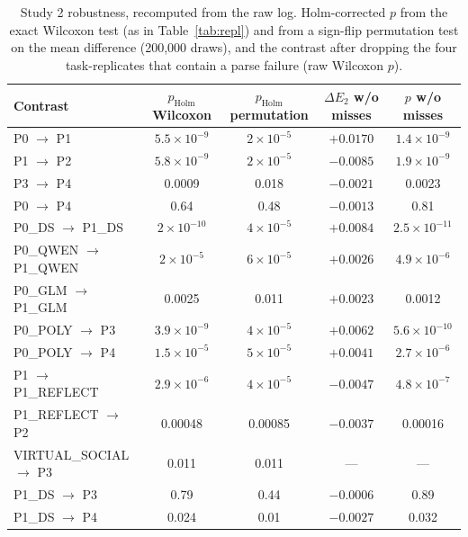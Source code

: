 \documentclass[10pt]{article}
\newenvironment{fittable}{\begin{lrbox}{\manuscripttable}}{%
\end{lrbox}\ifdim\wd\manuscripttable>\linewidth
\resizebox{\linewidth}{!}{\usebox{\manuscripttable}}%
\else\usebox{\manuscripttable}\fi}
\theoremstyle{manuscript}\newtheorem{proposition}{Proposition}
\newcommand{\pH}{p_{\text{Holm}}}
\begin{document}
\FloatBarrier

\begin{table}[ht]\centering\small\setlength{\tabcolsep}{5pt}
\caption{Study 2 robustness, recomputed from the raw log. Holm-corrected $p$ from the exact Wilcoxon test (as in Table~\ref{tab:repl}) and from a sign-flip permutation test on the mean difference (200,000 draws), and the contrast after dropping the four task-replicates that contain a parse failure (raw Wilcoxon $p$).}\label{tab:s2robust}
\begin{fittable}
\begin{tabular}{@{}lcccc@{}}\toprule
Contrast & $\pH$ Wilcoxon & $\pH$ permutation & $\Delta E_2$ w/o misses & $p$ w/o misses\\\midrule
P0 $\to$ P1 & $5.5\times10^{-9}$ & $2\times10^{-5}$ & $+0.0170$ & $1.4\times10^{-9}$\\
P1 $\to$ P2 & $5.8\times10^{-9}$ & $2\times10^{-5}$ & $-0.0085$ & $1.9\times10^{-9}$\\
P3 $\to$ P4 & 0.0009 & 0.018 & $-0.0021$ & 0.0023\\
P0 $\to$ P4 & 0.64 & 0.48 & $-0.0013$ & 0.81\\
P0\_DS $\to$ P1\_DS & $2\times10^{-10}$ & $4\times10^{-5}$ & $+0.0084$ & $2.5\times10^{-11}$\\
P0\_QWEN $\to$ P1\_QWEN & $2\times10^{-5}$ & $6\times10^{-5}$ & $+0.0026$ & $4.9\times10^{-6}$\\
P0\_GLM $\to$ P1\_GLM & 0.0025 & 0.011 & $+0.0023$ & 0.0012\\
P0\_POLY $\to$ P3 & $3.9\times10^{-9}$ & $4\times10^{-5}$ & $+0.0062$ & $5.6\times10^{-10}$\\
P0\_POLY $\to$ P4 & $1.5\times10^{-5}$ & $5\times10^{-5}$ & $+0.0041$ & $2.7\times10^{-6}$\\
P1 $\to$ P1\_REFLECT & $2.9\times10^{-6}$ & $4\times10^{-5}$ & $-0.0047$ & $4.8\times10^{-7}$\\
P1\_REFLECT $\to$ P2 & 0.00048 & 0.00085 & $-0.0037$ & 0.00016\\
VIRTUAL\_SOCIAL $\to$ P3 & 0.011 & 0.011 & --- & ---\\
P1\_DS $\to$ P3 & 0.79 & 0.44 & $-0.0006$ & 0.89\\
P1\_DS $\to$ P4 & 0.024 & 0.01 & $-0.0027$ & 0.032\\\bottomrule
\end{tabular}
\end{fittable}
\end{table}
\end{document}
